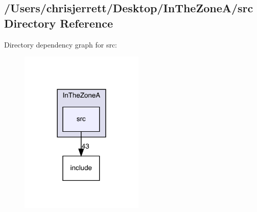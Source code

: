 \subsection{/\+Users/chrisjerrett/\+Desktop/\+In\+The\+Zone\+A/src Directory Reference}
\label{dir_43c51a3ec8bbef0bcb775b7b46ba4a2c}
Directory dependency graph for src\+:
\nopagebreak
\begin{figure}[H]
\begin{center}
\leavevmode
\includegraphics[width=167pt]{dir_43c51a3ec8bbef0bcb775b7b46ba4a2c_dep}
\end{center}
\end{figure}
